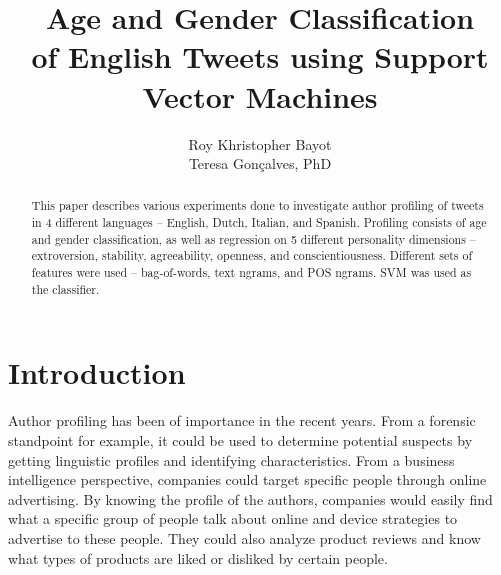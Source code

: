 \documentclass[a4paper]{llncs}
\begin{document}
\title{Age and Gender Classification\\
of English Tweets using Support Vector Machines}
\titlerunning{}
\author{Roy Khristopher Bayot\\Teresa Gonçalves, PhD}

\maketitle
\begin{abstract}
This paper describes various experiments done to investigate author profiling of tweets in 4 different languages – English, Dutch, Italian, and Spanish. Profiling consists of age and gender classification, as well as regression on 5 different personality dimensions – extroversion, stability, agreeability, openness, and conscientiousness. Different sets of features were used – bag-of-words, text ngrams, and POS ngrams. SVM was used as the classifier.



\end{abstract}

\section{Introduction}
Author profiling has been of importance in the recent years. From a forensic standpoint for example, it could be used to determine potential suspects by getting linguistic profiles and identifying characteristics. From a business intelligence perspective, companies could target specific people through online advertising. By knowing the profile of the authors, companies would easily find what a specific group of people talk about online and device strategies to advertise to these people. They could also analyze product reviews and know what types of products are liked or disliked by certain people. 
\end{document}
